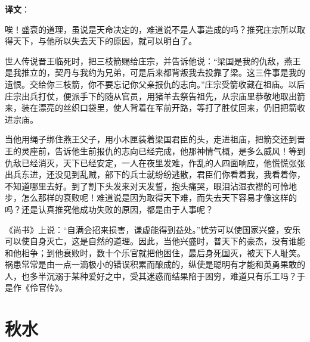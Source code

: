 \documentclass[12pt,UTF-8,openany]{ctexbook}
\begin{document}
\newpage

\textbf{译文}：

\vspace{1em}

\begin{normalsize}
    
    唉！盛衰的道理，虽说是天命决定的，难道说不是人事造成的吗？推究庄宗所以取得天下，与他所以失去天下的原因，就可以明白了。
    
    世人传说晋王临死时，把三枝箭赐给庄宗，并告诉他说：“梁国是我的仇敌，燕王是我推立的，契丹与我约为兄弟，可是后来都背叛我去投靠了梁。这三件事是我的遗恨。交给你三枝箭，你不要忘记你父亲报仇的志向。”庄宗受箭收藏在祖庙。以后庄宗出兵打仗，便派手下的随从官员，用猪羊去祭告祖先，从宗庙里恭敬地取出箭来，装在漂亮的丝织口袋里，使人背着在军前开路，等打了胜仗回来，仍旧把箭收进宗庙。
    
    当他用绳子绑住燕王父子，用小木匣装着梁国君臣的头，走进祖庙，把箭交还到晋王的灵座前，告诉他生前报仇的志向已经完成，他那神情气概，是多么威风！等到仇敌已经消灭，天下已经安定，一人在夜里发难，作乱的人四面响应，他慌慌张张出兵东进，还没见到乱贼，部下的兵士就纷纷逃散，君臣们你看着我，我看着你，不知道哪里去好。到了割下头发来对天发誓，抱头痛哭，眼泪沾湿衣襟的可怜地步，怎么那样的衰败呢！难道说是因为取得天下难，而失去天下容易才像这样的吗？还是认真推究他成功失败的原因，都是由于人事呢？
    
    《尚书》上说：“自满会招来损害，谦虚能得到益处。”忧劳可以使国家兴盛，安乐可以使自身灭亡，这是自然的道理。因此，当他兴盛时，普天下的豪杰，没有谁能和他相争；到他衰败时，数十个乐官就把他困住，最后身死国灭，被天下人耻笑。祸患常常是由一点一滴极小的错误积累而酿成的，纵使是聪明有才能和英勇果敢的人，也多半沉溺于某种爱好之中，受其迷惑而结果陷于困穷，难道只有乐工吗？于是作《伶官传》。
    
\end{normalsize}



\chapter{秋水}
\end{document}
